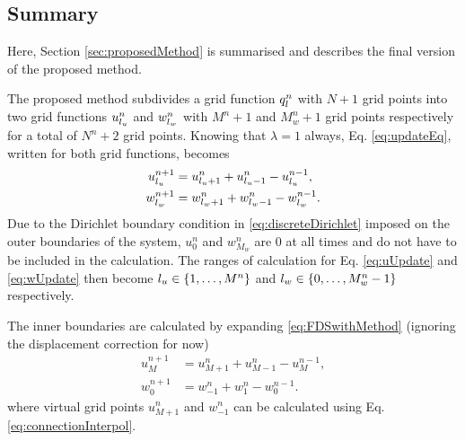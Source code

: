 % 

\subsection{Summary}
Here, Section \ref{sec:proposedMethod} is summarised and describes the final version of the proposed method.

The proposed method subdivides a grid function $q_l^n$ with $ N+1$ grid points into two grid functions $u_{l_u}^n$ and $w_{l_w}^n$ with $M^n+1$ and $M_w^n+1$ grid points respectively for a total of $N^n+2$ grid points. Knowing that $\lambda=1$ always, Eq. \eqref{eq:updateEq}, written for both grid functions, becomes 
\begin{subequations}\label{eq:uwUpdates}
    \begin{align}
        u_{l_u}^{n+1} &= u_{{l_u}+1}^n + u_{{l_u}-1}^n - u_{l_u}^{n-1},\label{eq:uUpdate}\\
        w_{l_w}^{n+1} &= w_{{l_w}+1}^n + w_{{l_w}-1}^n - w_{l_w}^{n-1}\label{eq:wUpdate}.
    \end{align}
\end{subequations}
%
Due to the Dirichlet boundary condition in \eqref{eq:discreteDirichlet} imposed on the outer boundaries of the system, $u_0^n$ and $w_{M_w}^n$ are $0$ at all times and do not have to be included in the calculation. The ranges of calculation for Eq. \eqref{eq:uUpdate} and \eqref{eq:wUpdate} then become ${l_u} \in \{1, \hdots, M^n\}$ and ${l_w} \in \{0, \hdots, M_w^n - 1\}$ respectively. 

The inner boundaries are calculated by expanding \eqref{eq:FDSwithMethod} (ignoring the displacement correction for now)
\begin{subequations}\label{eq:innerboundariesExpanded}
    \begin{align}
        u_M^{n+1} &= u_{M+1}^n + u_{M-1}^n - u_M^{n-1},\\
        w_0^{n+1} &= w_{-1}^n + w_{1}^n - w_0^{n-1}.
    \end{align}
\end{subequations}
%
where virtual grid points $u_{M+1}^n$ and $w_{-1}^n$ can be calculated using Eq. \eqref{eq:connectionInterpol}.

